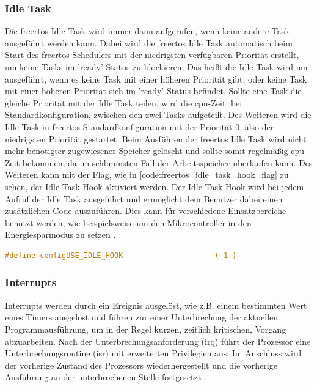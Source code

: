 \documentclass[../EDF Master Thesis.tex]{subfiles}
\begin{document}
\subsubsection{Idle Task} \label{section:idle_task}
Die \ac{freertos} Idle Task wird immer dann aufgerufen, wenn keine andere Task ausgeführt werden kann.
Dabei wird die \ac{freertos} Idle Task automatisch beim Start des \ac{freertos}-Schedulers mit der niedrigsten verfügbaren Priorität erstellt, um keine Tasks im 'ready' Status zu blockieren.
Das heißt die Idle Task wird nur ausgeführt, wenn es keine Task mit einer höheren Priorität gibt, oder keine Task mit einer höheren Priorität sich im 'ready' Status befindet.
Sollte eine Task die gleiche Priorität mit der Idle Task teilen, wird die \ac{cpu}-Zeit, bei Standardkonfiguration, zwischen den zwei Tasks aufgeteilt.
Des Weiteren wird die Idle Task in \ac{freertos} Standardkonfiguration mit der Priorität 0, also der niedrigsten Priorität gestartet.
Beim Ausführen der \ac{freertos} Idle Task wird nicht mehr benötigter zugewiesener Speicher gelöscht und sollte somit regelmäßig \ac{cpu}-Zeit bekommen, da im schlimmsten Fall der Arbeitsspeicher überlaufen kann.
Des Weiteren kann mit der Flag, wie in \autoref{code:freertos_idle_task_hook_flag} zu sehen, der Idle Task Hook aktiviert werden.
Der Idle Task Hook wird bei jedem Aufruf der Idle Task ausgeführt und ermöglicht dem Benutzer dabei einen zusätzlichen Code auszuführen.
Dies kann für verschiedene Einsatzbereiche benutzt werden, wie beispielsweise um den Mikrocontroller in den Energiesparmodus zu setzen \autocite{freertos_idle_task}.

\begin{lstlisting}[language=C, caption=FreeRTOS Idle Task Hook Flag, label=code:freertos_idle_task_hook_flag]
    #define configUSE_IDLE_HOOK                     ( 1 )
\end{lstlisting}


\subsubsection{Interrupts} \label{section:interrupts}
Interrupts werden durch ein Ereignis ausgelöst, wie z.B. einem bestimmten Wert eines Timers ausgelöst und führen zur einer Unterbrechung der aktuellen Programmausführung, um in der Regel kurzen, zeitlich kritischen, Vorgang abzuarbeiten.
Nach der Unterbrechungsanforderung (\ac{irq}) führt der Prozessor eine Unterbrechungsroutine (\ac{isr}) mit erweiterten Privilegien aus.
Im Anschluss wird der vorherige Zustand des Prozessors wiederhergestellt und die vorherige Ausführung an der unterbrochenen Stelle fortgesetzt \parencite{grundkurs_betriebssysteme, wiki:008}.
\end{document}
